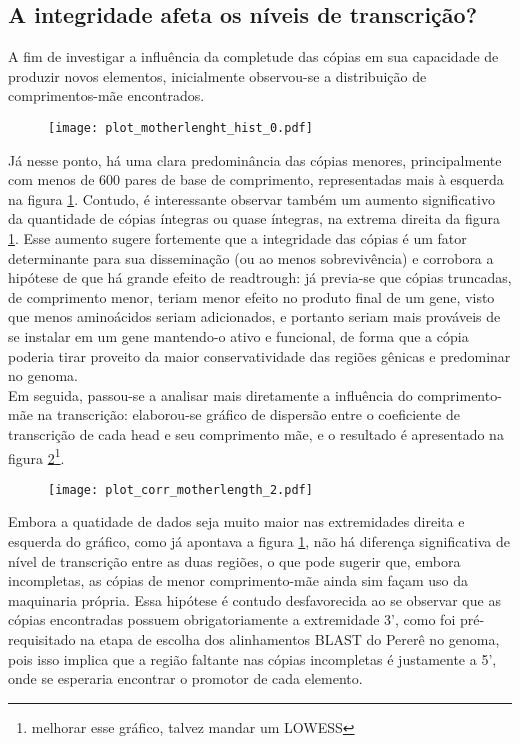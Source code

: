 \documentclass{article}
\begin{document}
\begin{multicols}{2}
\subsection{A integridade afeta os níveis de transcrição?}

A fim de investigar a influência da completude das cópias em sua capacidade de produzir novos elementos, inicialmente observou-se a distribuição de comprimentos-mãe encontrados.\\

\begin{figure}[H]
  \label{mlhist}
  \centering
  \texttt{[image: plot\_motherlenght\_hist\_0.pdf]}
\end{figure}

Já nesse ponto, há uma clara predominância das cópias menores, principalmente com menos de 600 pares de base de comprimento, representadas mais à esquerda na figura \ref{mlhist}. Contudo, é interessante observar também um aumento significativo da quantidade de cópias íntegras ou quase íntegras, na extrema direita da figura \ref{mlhist}. Esse aumento sugere fortemente que a integridade das cópias é um fator determinante para sua disseminação (ou ao menos sobrevivência) e corrobora a hipótese de que há grande efeito de readtrough: já previa-se que cópias truncadas, de comprimento menor, teriam menor efeito no produto final de um gene, visto que menos aminoácidos seriam adicionados, e portanto seriam mais prováveis de se instalar em um gene mantendo-o ativo e funcional, de forma que a cópia poderia tirar proveito da maior conservatividade das regiões gênicas e predominar no genoma.\\

	Em seguida, passou-se a analisar mais diretamente a influência do comprimento-mãe na transcrição: elaborou-se gráfico de dispersão entre o coeficiente de transcrição de cada head e seu comprimento mãe, e o resultado é apresentado na figura \ref{mlrc}\footnote{melhorar esse gráfico, talvez mandar um LOWESS}.

\begin{figure}[H]
	\centering
	\label{mlrc}
	\texttt{[image: plot\_corr\_motherlength\_2.pdf]}
\end{figure}

Embora a quatidade de dados seja muito maior nas extremidades direita e esquerda do gráfico, como já apontava a figura \ref{mlhist}, não há diferença significativa de nível de transcrição entre as duas regiões, o que pode sugerir que, embora incompletas, as cópias de menor comprimento-mãe ainda sim façam uso da maquinaria própria. Essa hipótese é contudo desfavorecida ao se observar que as cópias encontradas possuem obrigatoriamente a extremidade 3', como foi pré-requisitado na etapa de escolha dos alinhamentos BLAST do Pererê no genoma, pois isso implica que a região faltante nas cópias incompletas é justamente a 5', onde se esperaria encontrar o promotor de cada elemento.\\


\end{multicols}
\end{document}
